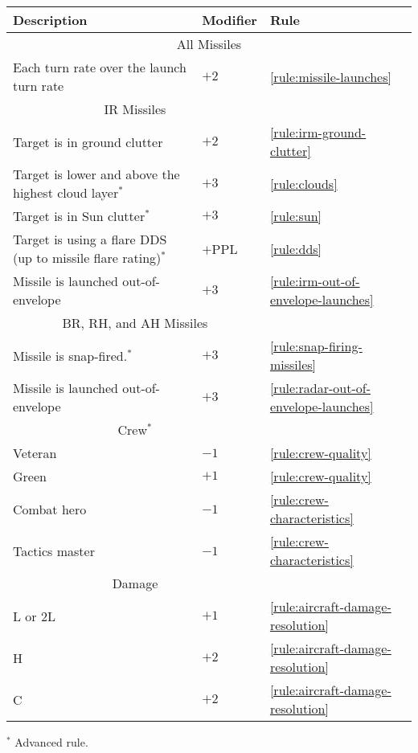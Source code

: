 {\begin{twocolumntable}
\begin{tabularx}{0.7\linewidth}{Xll}
\toprule
Description&Modifier&Rule\\
\midrule
\multicolumn{3}{c}{All Missiles}\\
\midrule
Each turn rate over the launch turn rate&$+2$&\ref{rule:missile-launches}\\
\midrule
\multicolumn{2}{c}{IR Missiles}\\
\midrule
Target is in ground clutter&$+2$&\ref{rule:irm-ground-clutter}\\
Target is lower and above the highest cloud layer$^*$&$+3$&\ref{rule:clouds}
\\
Target is in Sun clutter$^*$&$+3$&\ref{rule:sun}\\
Target is using a flare DDS (up to missile flare rating)$^*$&$+$PPL&\ref{rule:dds}\\
Missile is launched out-of-envelope&$+3$&\ref{rule:irm-out-of-envelope-launches}\\
\midrule
\multicolumn{2}{c}{BR, RH, and AH Missiles}\\
\midrule
Missile is snap-fired.$^*$&$+3$&\ref{rule:snap-firing-missiles}\\
Missile is launched out-of-envelope&$+3$&\ref{rule:radar-out-of-envelope-launches}\\
\midrule
\multicolumn{2}{c}{Crew$^*$}\\
\midrule
Veteran&$-1$&\ref{rule:crew-quality}\\
Green&$+1$&\ref{rule:crew-quality}\\
Combat hero&$-1$&\ref{rule:crew-characteristics}\\
Tactics master&$-1$&\ref{rule:crew-characteristics}\\
\midrule
\multicolumn{2}{c}{Damage}\\
\midrule
L or 2L&$+1$&\ref{rule:aircraft-damage-resolution}\\
H&$+2$&\ref{rule:aircraft-damage-resolution}\\
C&$+2$&\ref{rule:aircraft-damage-resolution}\\
\bottomrule
\end{tabularx}
\begin{tablenote}{0.7\linewidth}
$^*$ Advanced rule.
\end{tablenote}
\end{twocolumntable}
}


